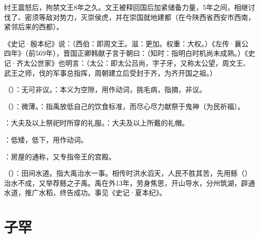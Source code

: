 {{\begin{lyenumerate}
\item 纣王震怒后，拘禁文王8年之久。文王被释回国后加紧储备力量，5年之间，相继讨伐了、密须等敌对势力，灭崇侯虎，并在崇国就地建都（在今陕西省西安市西南，紧邻后来的西都）。

\item 《史记·殷本纪》说：（西伯：即周文王。滋：更加。权重：大权。）《左传·襄公四年》（前569年），晋国正卿韩献子言于朝曰：（知时：指明白时机尚未成熟。）《史记·齐太公世家》也明言：（太公：即太公吕尚，字子牙，又称太公望，周文王、武王之师，伐的军事总指挥，周朝建立后受封于齐，为齐开国之祖。）
\end{lyenumerate}
}
}
{}


{
\item {}（）：无可非议。：本义为空隙，用作动词，挑毛病，指摘，非议。
\item {}（）：微薄。：指禹放低自己的饮食标准，而尽心尽力献祭于鬼神（为民祈福）。

\item {}：大夫及以上祭祀时所穿的礼服。：大夫及以上所戴的礼帽。
\item {}：低矮，低下，用作动词。
\item {}：房屋的通称，又专指帝王的宫殿。

\item {}（）：田间水道。指大禹治水一事。相传时洪水滔天，人民不胜其苦，先用鲧（）治水不成，又举荐鲧之子禹。禹在外13年，劳身焦思，开山导水，分州筑湖，辟通水道，推广水稻，终告成功。事见《史记·夏本纪》。
}
{}



\chapter{子罕}

